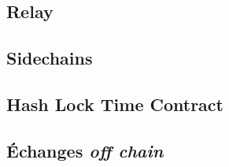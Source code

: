 \subsection[Relay]{Relay}

\subsection[Sidechains]{Sidechains}

\subsection[HLTC]{Hash Lock Time Contract}


\subsection[offChain]{Échanges \textit{off chain}}

